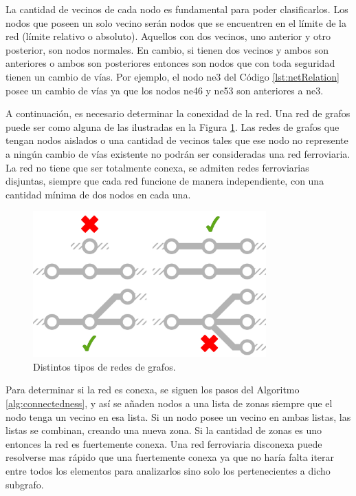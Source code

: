     La cantidad de vecinos de cada nodo es fundamental para poder clasificarlos. Los nodos que poseen un solo vecino serán nodos que se encuentren en el límite de la red (límite relativo o absoluto). Aquellos con dos vecinos, uno anterior y otro posterior, son nodos normales. En cambio, si tienen dos vecinos y ambos son anteriores o ambos son posteriores entonces son nodos que con toda seguridad tienen un cambio de vías. Por ejemplo, el nodo ne3 del Código \ref{lst:netRelation} posee un cambio de vías ya que los nodos ne46 y ne53 son anteriores a ne3.

    A continuación, es necesario determinar la conexidad de la red. Una red de grafos puede ser como alguna de las ilustradas en la Figura \ref{fig:conexidad}. Las redes de grafos que tengan nodos aislados o una cantidad de vecinos tales que ese nodo no represente a ningún cambio de vías existente no podrán ser consideradas una red ferroviaria. La red no tiene que ser totalmente conexa, se admiten redes ferroviarias disjuntas, siempre que cada red funcione de manera independiente, con una cantidad mínima de dos nodos en cada una.   

    \begin{figure}[H]
        \centering
        \includegraphics[width=0.8\textwidth]{Figuras/conexo.PNG}
        \centering\caption{Distintos tipos de redes de grafos.}
        \label{fig:conexidad}
    \end{figure}

    Para determinar si la red es conexa, se siguen los pasos del Algoritmo \ref{alg:connectedness}, y así se añaden nodos a una lista de zonas siempre que el nodo tenga un vecino en esa lista. Si un nodo posee un vecino en ambas listas, las listas se combinan, creando una nueva zona. Si la cantidad de zonas es uno entonces la red es fuertemente conexa. Una red ferroviaria disconexa puede resolverse mas rápido que una fuertemente conexa ya que no haría falta iterar entre todos los elementos para analizarlos sino solo los pertenecientes a dicho subgrafo.
        
